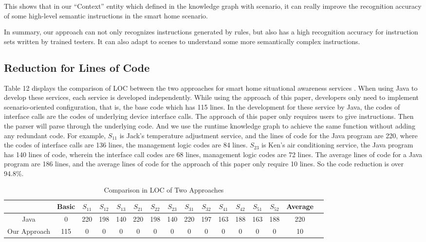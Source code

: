 This shows that in our “Context” entity which defined in the knowledge graph with scenario, it can really improve the recognition accuracy of some high-level semantic instructions in the smart home scenario.

In summary, our approach can not only recognizes instructions generated by rules, but also has a high recognition accuracy for instruction sets written by trained testers. It can also adapt to scenes to understand some more semantically complex instructions.

\subsection{Reduction for Lines of Code}

Table 12 displays the comparison of LOC between the two approaches for smart home situational awareness services . When using Java to develop these services, each service is developed independently. While using the approach of this paper, developers only need to implement scenario-oriented configuration, that is, the base code which has 115 lines. In the development for these service by Java, the codes of interface calls are the codes of underlying device interface calls. The approach of this paper only requires users to give instructions. Then the parser will parse through the underlying code. And we use the runtime knowledge graph to achieve the same function without adding any redundant code. For example, $S_{11}$ is Jack's temperature adjustment service, and the lines of code for the Java program are 220, where the codes of interface calls are 136 lines, the management logic codes are 84 lines. $S_{23}$ is Ken's air conditioning service, the Java program has 140 lines of code, wherein the interface call codes are 68 lines, management logic codes are 72 lines. The average lines of code for a Java program are 186 lines, and the average lines of code for the approach of this paper only require 10 lines. So the code reduction is over 94.8\%.

\begin{table}[h]
	\centering
	\begin{tabular}[h]{|c|c|c|c|c|c|c|c|c|c|c|c|c|c|c|c|}				
		\hline
		& Basic& $S_{11}$ & $S_{12}$ & $S_{13}$ & $S_{21}$ & $S_{22}$ & $S_{23}$ & $S_{31}$ & $S_{32}$& $S_{41}$ & $S_{42}$& $S_{51}$ & $S_{52}$&Average\\
		\hline
		Java & 0 & 220 & 198  & 140 & 220 & 198  & 140 & 220& 197  & 163 & 188& 163  & 188 & 220\\
		\hline
		Our Approach & 115 & 0 & 0 & 0 & 0 & 0& 0 & 0 & 0& 0 & 0 & 0 &0&10\\
		\hline		
	\end{tabular}
	\caption{Comparison in LOC of Two Approaches}	
\end{table}

